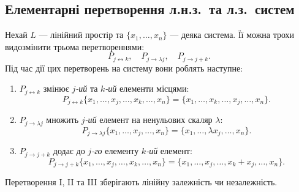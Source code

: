 \documentclass{math_library}
\begin{document}
	\subsection{Елементарні перетворення л.н.з.\ та л.з.\ систем}
	Нехай $L$ --- лінійний простір та $\{x_1, \dots, x_n\}$ --- деяка система. Її можна трохи видозмінити трьома перетвореннями: 
	\[
	P_{j \leftrightarrow k},\quad P_{j \to \lambda j},\quad P_{j \to j+k}.
	\]
	Під час дії цих перетворень на систему вони роблять наступне:
	\begin{enumerate}[wide = 0pt, label={\Roman*.}]
	\item $P_{j \leftrightarrow k}$ змінює $j$\textit{-ий} та $k$\textit{-ий} елементи місцями: 
	\[
	P_{j \leftrightarrow k} \{x_1, \dots, x_j, \dots, x_k, \dots, x_n\} = \{x_1, \dots, x_k, \dots, x_j, \dots, x_n\}.
	\]

	\item $P_{j \to \lambda j}$ множить $j$\textit{-ий} елемент на ненульових скаляр $\lambda$:
	\[
	P_{j \to \lambda j} \{x_1, \dots, x_j, \dots, x_n\} = \{x_1, \dots, \lambda x_j, \dots, x_n\}.
	\]
	
	\item $P_{j \to j+k}$ додає до $j$\textit{-го} елементу $k$\textit{-ий} елемент:
	\[
	P_{j \to j+k} \{x_1, \dots, x_j, \dots, x_k, \dots, x_n\} = \{x_1, \dots, x_j, \dots,  x_k + x_j, \dots, x_n\}.
	\]
	\end{enumerate}

	\begin{proposition}
	Перетворення I, II та III зберігають лінійну залежність чи незалежність.
	\end{proposition}
	
\end{document}
